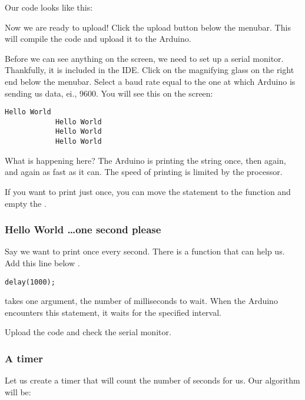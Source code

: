 \documentclass{article}
\begin{document}
			Our code looks like this:

			

			Now we are ready to upload! Click the upload button below the menubar. This will compile the code and upload it to the Arduino.

			Before we can see anything on the screen, we need to set up a serial monitor. Thankfully, it is included in the IDE. Click on the magnifying glass on the right end below the menubar. Select a baud rate equal to the one at which Arduino is sending us data, ei., 9600. You will see this on the screen:

			\begin{lstlisting}[firstnumber = 1738]
			Hello World
			Hello World
			Hello World
			Hello World
			\end{lstlisting}

			What is happening here? The Arduino is printing the string once, then again, and again as fast as it can. The speed of printing is limited by the processor.

			If you want to print just once, you can move the  statement to the  function and empty the .

		\subsubsection{Hello World \ldots one second please}

			Say we want to print  once every second. There is a function  that can help us. Add this line below .

			\begin{lstlisting}[firstnumber = 9]
			delay(1000);
			\end{lstlisting}

			 takes one argument, the number of milliseconds to wait. When the Arduino encounters this statement, it waits for the specified interval. 

			Upload the code and check the serial monitor.

		\subsubsection{A timer}

			Let us create a timer that will count the number of seconds for us. Our algorithm will be:
\end{document}
